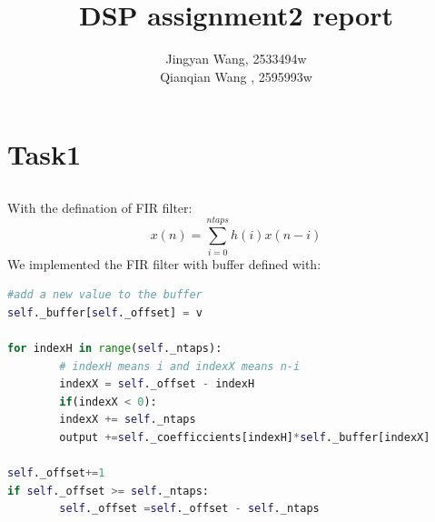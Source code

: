 \documentclass[a4paper,12pt]{article}
\begin{document}
%
   \title{\textbf{DSP assignment2 report}}

   \author{Jingyan Wang, 2533494w \\ Qianqian Wang , 2595993w}
          
   \date{}

   \maketitle
   
   \tableofcontents
 
  \newpage

\section{Task1}
\subsection{}
With the defination of FIR filter:
$$
x(n) = \sum_{i=0}^{ntaps}h(i)x(n-i)
$$
We implemented the FIR filter with buffer defined with:
\begin{lstlisting}[language=Python]
#add a new value to the buffer
self._buffer[self._offset] = v

for indexH in range(self._ntaps):
		# indexH means i and indexX means n-i
		indexX = self._offset - indexH
		if(indexX < 0):
		indexX += self._ntaps     
		output +=self._coefficcients[indexH]*self._buffer[indexX]

self._offset+=1
if self._offset >= self._ntaps:
		self._offset =self._offset - self._ntaps
\end{lstlisting}
\end{document}

